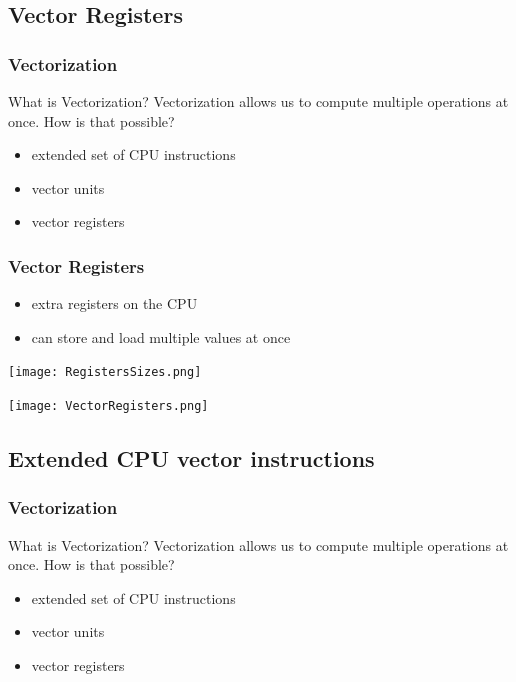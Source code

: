 \documentclass[compress]{beamer}
\begin{document}
\subsection{Vector Registers}
\begin{frame}[fragile]
    \frametitle{Vectorization}
What is Vectorization?\newline\newline
Vectorization allows us to compute multiple operations at once.\newline\newline
How is that possible?
    \begin{itemize}
        \item extended set of CPU instructions
        \item vector units
        \item vector registers 
    \end{itemize}
\end{frame}
\begin{frame}
    \frametitle{Vector Registers}
    \begin{itemize}
        \item extra registers on the CPU
        \item can store and load multiple values at once
    \end{itemize}
    \texttt{[image: RegistersSizes.png]}
\end{frame}
\begin{frame}
    \texttt{[image: VectorRegisters.png]}
\end{frame}

\subsection{Extended CPU vector instructions}
\begin{frame}[fragile]
    \frametitle{Vectorization}

What is Vectorization?\newline\newline
Vectorization allows us to compute multiple operations at once.\newline\newline
How is that possible?
    \begin{itemize}
        \item extended set of CPU instructions
        \item vector units
        \item vector registers 
    \end{itemize}
\end{frame}
\end{document}
